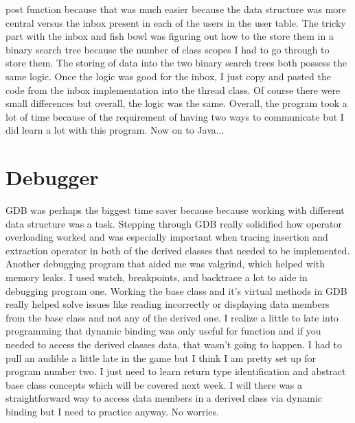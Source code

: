 \documentclass[11pt, a4paper]{article}
\begin{document}
post function because that was much easier because the data structure was more central versus the inbox present in each of the users in the user table. The tricky part with the inbox and fish bowl was figuring out how to the store them in a binary search tree because the number of class scopes I had to go through to store them. The storing of data into the two binary search trees both possess the same logic. Once the logic was good for the inbox, I just copy and pasted the code from the inbox implementation into the thread class. Of course there were small differences but overall, the logic was the same. Overall, the program took a lot of time because of the requirement of having two ways to communicate but I did learn a lot with this program. Now on to Java...

\section*{Debugger}
GDB was perhaps the biggest time saver because because working with different data structure was a task. Stepping through GDB really solidified how operator overloading worked and was especially important when tracing insertion and extraction operator in both of the derived classes that needed to be implemented. Another debugging program that aided me was valgrind, which helped with memory leaks. I used watch, breakpoints, and backtrace a lot to aide in debugging program one. Working the base class and it's virtual methods in GDB really helped solve issues like reading incorrectly or displaying data members from the base class and not any of the derived one. I realize a little to late into programming that dynamic binding was only useful for function and if you needed to access the derived classes data, that wasn't going to happen. I had to pull an audible a little late in the game but I think I am pretty set up for program number two. I just need to learn return type identification and abstract base class concepts which will be covered next week. I will there was a straightforward way to access data members in a derived class via dynamic binding but I need to practice anyway. No worries.
\end{document}
